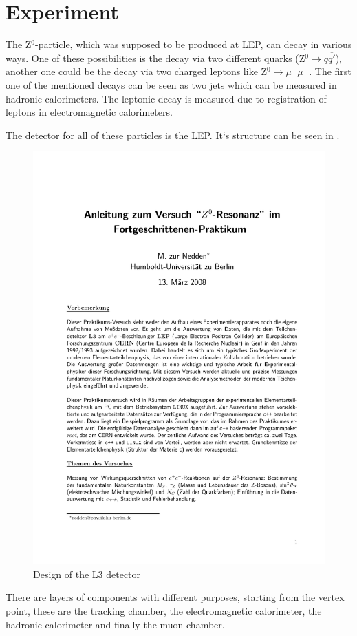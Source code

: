 \documentclass[epj,nopacs]{svjour}
\begin{document}
\section{ Experiment}

The Z$^0$-particle, which was supposed to be produced at LEP, can decay in
various ways. One of these possibilities is the decay via two different quarks 
(Z$^0→q\overline{q'}$), another one could be the decay via two charged leptons
like Z$^0→ μ^+μ^-$. The first one of the mentioned decays can be seen
as two jets which can be measured in hadronic calorimeters. The leptonic decay
is measured due to registration of leptons in electromagnetic calorimeters. 

The detector for all of these particles is the LEP. It`s structure can be seen
in .
\begin{figure}[htb]
 \centering
 \includegraphics[page=5,viewport=286 620 508 765,clip,%
  width=\columnwidth,keepaspectratio]{../../Z0/docs/Z0ResFprakt}
 \caption{Design of the L3 detector\cite{script}}
 \label{fig:aufbau}
\end{figure}
There are layers of components with different purposes, starting from the
vertex point, these are the tracking chamber, the electromagnetic calorimeter,
the hadronic calorimeter and finally the muon chamber.
\end{document}
